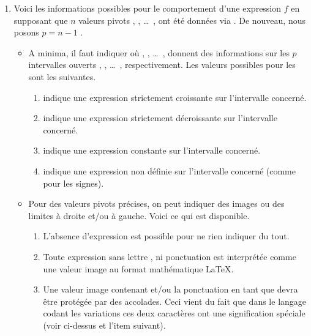 \documentclass[12pt, a4paper]{article}
\begin{document}
\begin{enumerate}
    \item Voici les informations possibles pour le comportement d'une expression $f$ en supposant que $n$ valeurs pivots  ,  , \dots\ ,  ont été données via  . De nouveau, nous posons $p = n - 1$ .
    \begin{itemize}
        \item A minima, il faut indiquer
        où
         ,  , \dots\ , 
        donnent des informations sur les $p$ intervalles ouverts
        \tdocinlatex{]x_1 ; x_2[} , \tdocinlatex{]x_2 ; x_3[} , \dots\ , \tdocinlatex{]x_p ; x_n[} respectivement.
        Les valeurs possibles pour les  sont les suivantes.
        \begin{enumerate}
            \item \tdocinlatex{<} indique une expression strictement croissante sur l'intervalle concerné.

            \item \tdocinlatex{>} indique une expression strictement décroissante sur l'intervalle concerné.

            \item \tdocinlatex{=} indique une expression constante sur l'intervalle concerné.

            \item {} indique une expression non définie sur l'intervalle concerné (comme pour les signes).
        \end{enumerate}


        \item Pour des valeurs pivots précises, on peut indiquer des images ou des limites à droite et/ou à gauche. Voici ce qui est disponible.
        \begin{enumerate}
            \item L'absence d'expression est possible pour ne rien indiquer du tout.

            \item Toute expression sans lettre , ni ponctuation \tdocinlatex{!} est interprétée comme une valeur image au format mathématique \LaTeX.

            \item Une valeur image contenant  et/ou la ponctuation \tdocinlatex{!} en tant que  devra être protégée par des accolades. Ceci vient du fait que dans le langage codant les variations ces deux caractères ont une signification spéciale (voir ci-dessus et l'item suivant).


\end{enumerate}
\end{itemize}
\end{enumerate}
\end{document}
